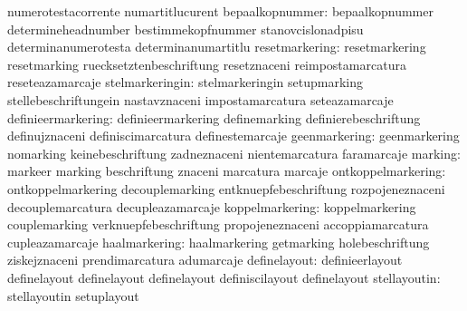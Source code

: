                                  numerotestacorrente              numartitlucurent
                 bepaalkopnummer: bepaalkopnummer                  determineheadnumber
                                  bestimmekopfnummer               stanovcislonadpisu
                                  determinanumerotesta             determinanumartitlu
                  resetmarkering: resetmarkering                   resetmarking
                                  ruecksetztenbeschriftung         resetznaceni
                                  reimpostamarcatura               reseteazamarcaje
                 stelmarkeringin: stelmarkeringin                  setupmarking
                                  stellebeschriftungein            nastavznaceni
                                  impostamarcatura                 seteazamarcaje
              definieermarkering: definieermarkering               definemarking
                                  definierebeschriftung            definujznaceni
                                  definiscimarcatura               definestemarcaje
                   geenmarkering: geenmarkering                    nomarking
                                  keinebeschriftung                zadneznaceni
                                  nientemarcatura                  faramarcaje
                         marking: markeer                          marking
                                  beschriftung                     znaceni
                                  marcatura                        marcaje
              ontkoppelmarkering: ontkoppelmarkering               decouplemarking
                                  entknuepfebeschriftung           rozpojeneznaceni
                                  decouplemarcatura                decupleazamarcaje %
                 koppelmarkering: koppelmarkering                  couplemarking
                                  verknuepfebeschriftung           propojeneznaceni
                                  accoppiamarcatura                cupleazamarcaje %
                   haalmarkering: haalmarkering                    getmarking
                                  holebeschriftung                 ziskejznaceni
                                  prendimarcatura                  adumarcaje %
                    definelayout: definieerlayout                  definelayout
                                  definelayout                     definelayout
                                  definiscilayout                  definelayout %
                    stellayoutin: stellayoutin                     setuplayout
